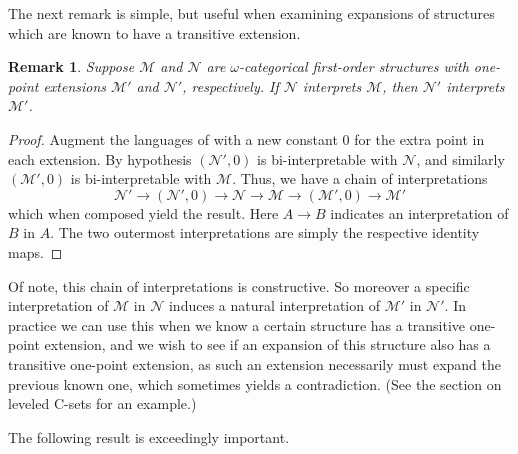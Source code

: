 \documentclass{amsart}
\newtheorem{remark}[theorem]{Remark}
\newcommand{\model}{\mathcal{M}}
\newcommand{\nodel}{\mathcal{N}}
\begin{document}
The next remark is simple, but useful when examining expansions of structures which are known to have a transitive extension. 

\begin{remark}\label{interpretation lemma}
    Suppose $\model$ and $\nodel$ are $\omega$-categorical first-order structures with one-point extensions $\model'$ and $\nodel'$, respectively. If $\nodel$ interprets $\model$, then $\nodel'$ interprets $\model'$. 
\end{remark}
\begin{proof}
    Augment the languages of with a new constant 0 for the extra point in each extension. By hypothesis $(\nodel', 0)$ is bi-interpretable with $\nodel$, and similarly $(\model', 0)$ is bi-interpretable with $\model$. Thus, we have a chain of interpretations
    $$\nodel' \rightarrow (\nodel', 0) \rightarrow \nodel \rightarrow \model \rightarrow (\model', 0) \rightarrow \model'$$
    which when composed yield the result. Here $A \to B$ indicates an interpretation of $B$ in $A$. The two outermost interpretations are simply the respective identity maps.
\end{proof}
Of note, this chain of interpretations is constructive. So moreover a specific interpretation of $\model$ in $\nodel$ induces a natural interpretation of $\model'$ in $\nodel'$. In practice we can use this when we know a certain structure has a transitive one-point extension, and we wish to see if an expansion of this structure also has a transitive one-point extension, as such an extension necessarily must expand the previous known one, which sometimes yields a contradiction. (See the section on leveled C-sets for an example.)

The following result is exceedingly important.
\end{document}
